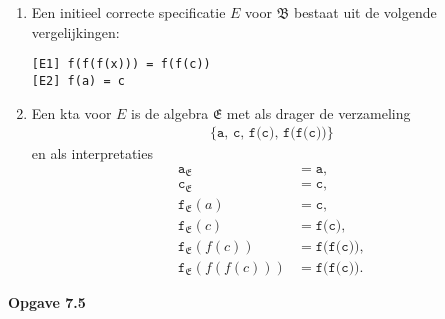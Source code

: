 \documentclass[a4paper,11pt]{article}
\begin{document}
\begin{enumerate}

\item %

Een initieel correcte specificatie $E$ voor $\mathfrak{B}$ bestaat uit de
volgende vergelijkingen:
\begin{verbatim}
[E1] f(f(f(x))) = f(f(c))
[E2] f(a) = c
\end{verbatim}

\item %

Een kta voor $E$ is de algebra $\mathfrak{E}$ met als drager de verzameling
\begin{align*}
\{\texttt{a}, \, \texttt{c}, \, \texttt{f(c)}, \, \texttt{f(f(c))}\}
\end{align*}
en als interpretaties
\begin{align*}
\texttt{a}_{\mathfrak{E}}          &= \texttt{a}, \\
\texttt{c}_{\mathfrak{E}}          &= \texttt{c}, \\
\texttt{f}_{\mathfrak{E}}(a)       &= \texttt{c}, \\
\texttt{f}_{\mathfrak{E}}(c)       &= \texttt{f(c)}, \\
\texttt{f}_{\mathfrak{E}}(f(c))    &= \texttt{f(f(c))}, \\
\texttt{f}_{\mathfrak{E}}(f(f(c))) &= \texttt{f(f(c))}.
\end{align*}

\end{enumerate}


{\bf Opgave 7.5}
\end{document}
